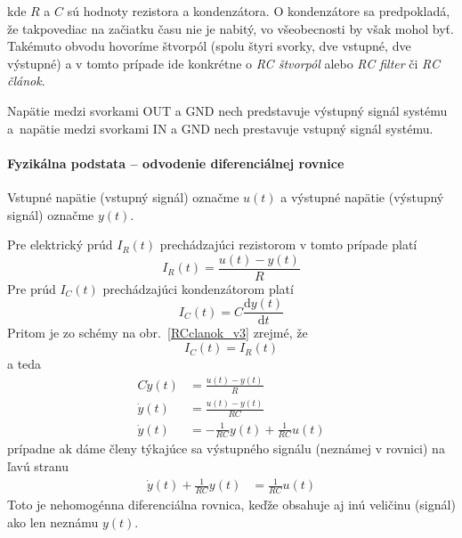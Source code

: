 \documentclass[a4paper, 10pt, ]{article}
\begin{document}
\begin{center}

	\makebox[\textwidth][c]{%
	
	}

	\label{RCclanok_v3}

\end{center}

\noindent
kde $R$ a $C$ sú hodnoty rezistora a kondenzátora. O kondenzátore sa predpokladá, že takpovediac na začiatku času nie je nabitý, vo všeobecnosti by však mohol byť. Takémuto obvodu hovoríme štvorpól (spolu štyri svorky, dve vstupné, dve výstupné) a v tomto prípade ide konkrétne o \emph{RC štvorpól} alebo \emph{RC filter} či \emph{RC článok}.

Napätie medzi svorkami \textsf{OUT} a \textsf{GND} nech predstavuje výstupný signál systému a~napätie medzi svorkami \textsf{IN} a \textsf{GND} nech prestavuje vstupný signál systému.


\paragraph{Fyzikálna podstata -- odvodenie diferenciálnej rovnice}


Vstupné napätie (vstupný signál) označme $u(t)$ a výstupné napätie (výstupný signál) označme $y(t)$.

Pre elektrický prúd $I_R(t)$ prechádzajúci rezistorom v tomto prípade platí
\begin{equation}
    I_R(t) = \frac{u(t) - y(t)}{R}
\end{equation}
Pre prúd $I_C(t)$ prechádzajúci kondenzátorom platí
\begin{equation}
    I_C(t) = C \frac{ \text{d}y(t)}{\text{d}t}
\end{equation}
Pritom je zo schémy na obr.~\ref{RCclanok_v3} zrejmé, že
\begin{equation}
    I_C(t) = I_R(t)
\end{equation}
a teda
\begin{align}
    C \dot y(t) &= \frac{u(t) - y(t)}{R} \\
    \dot y(t) &= \frac{u(t) - y(t)}{RC} \\
    \dot y(t) &= -\frac{1}{RC} y(t)  + \frac{1}{RC} u(t)
\end{align}
prípadne ak dáme členy týkajúce sa výstupného signálu (neznámej v rovnici) na ľavú stranu
\begin{align}
    \dot y(t) + \frac{1}{RC} y(t) &=   \frac{1}{RC} u(t)
\end{align}
Toto je nehomogénna diferenciálna rovnica, keďže obsahuje aj inú veličinu (signál)  ako len neznámu $y(t)$.
\end{document}
